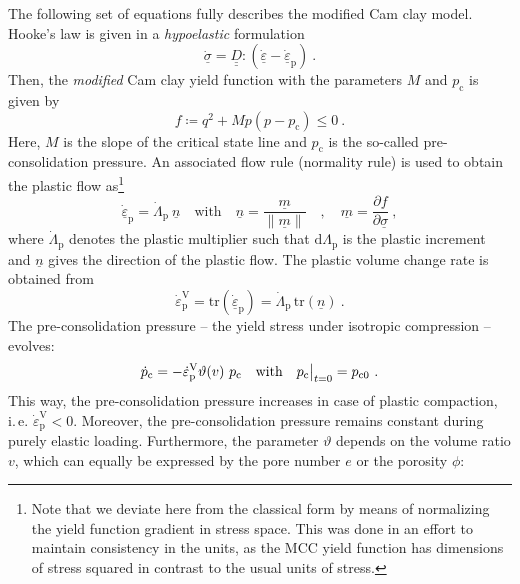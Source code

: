 \documentclass[paper=a4, twoside, pagesize]{scrartcl}
\newcommand{\tensor}[1]{\underline{#1}}
\newcommand{\tensorf}[1]{\underline{\underline{#1}}}
\newcommand{\ppkt}{\colon}
\renewcommand{\c}{\text{c}}
\renewcommand{\d}{\text{d}}
\newcommand{\p}{\text{p}}
\newcommand{\with}{\text{with}}
\newcommand{\trace}{\mathrm{tr}}
\newcommand{\minus}{-}
\begin{document}
The following set of equations fully describes the modified Cam clay model. Hooke's law is given in a \emph{hypoelastic} formulation
\begin{equation}\label{eq:linearHypoElasticity}
  \dot{\tensor\sigma} = \tensorf D\ppkt\left(\dot{\tensor\varepsilon} - \dot{\tensor\varepsilon}_\p \right) \ .
\end{equation}
Then, the \emph{modified} Cam clay yield function with the parameters $M$ and $p_\c$ is given by
\begin{equation}
  f \coloneqq q^2 + M p(p-p_\c) \leq 0 \ .
\end{equation}
Here, $M$ is the slope of the critical state line and $p_\c$ is the so-called pre-consolidation pressure.
An associated flow rule (normality rule) is used to obtain the plastic flow as\footnote{Note that we deviate here from the classical form by means of normalizing the yield function gradient in stress space. This was done in an effort to maintain consistency in the units, as the MCC yield function has dimensions of stress squared in contrast to the usual units of stress.}
\begin{equation}\label{eq:flowRule}
  \dot{\tensor\varepsilon}_\p = \dot{\varLambda}_\p\ \tensor n \quad\with\quad \tensor n =\frac{\tensor m}{\|\tensor m\|} \quad,\quad \tensor m = \frac{\partial f}{\partial \tensor\sigma} \ ,
\end{equation}
where $\dot{\varLambda}_\p$ denotes the plastic multiplier such that $\d{\varLambda}_\p$ is the plastic increment and $\tensor n$ gives the direction of the plastic flow. The plastic volume change rate is obtained from
\begin{equation}
  \dot{\varepsilon}_\p^\text{V} = \trace(\dot{\tensor\varepsilon}_\p) = \dot{\varLambda}_\p\,\trace(\tensor n)\ . %
\end{equation}
The pre-consolidation pressure -- the yield stress under isotropic compression -- evolves:
\begin{equation}\label{eq:evolutionPc}
  \dot{p}_\c = \minus\dot{\varepsilon}_\p^\text{V} \vartheta(v)\ p_\c \quad\with\quad p_\c\big{|}_{t=0} = p_{\c 0} \ .
\end{equation}
This way, the pre-consolidation pressure increases in case of plastic compaction, i.\,e. $\dot{\varepsilon}_\p^\text{V}<0$. Moreover, the pre-consolidation pressure remains constant during purely elastic loading. Furthermore, the parameter $\vartheta$ depends on the volume ratio $v$, which can equally be expressed by the pore number $e$ or the porosity $\phi$:
\end{document}
